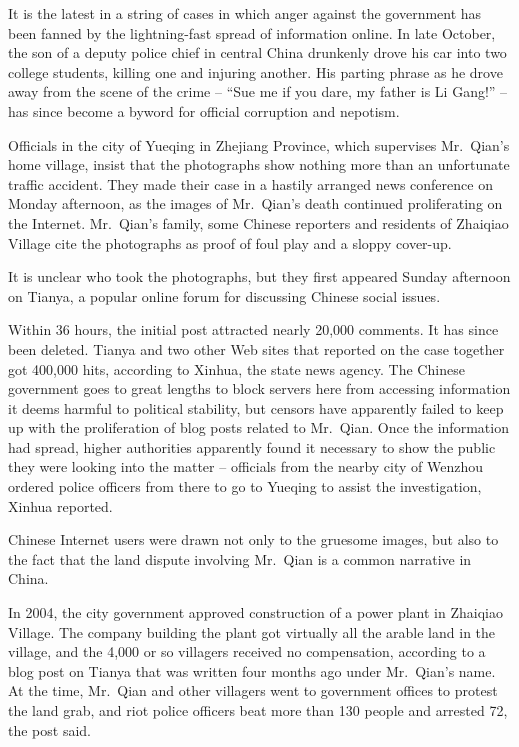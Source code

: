 ﻿\documentclass[12pt]{article}
\begin{document}
It is the latest in a string of cases in which anger against the government has been fanned by the
lightning-fast spread of information online. In late October, the son of a deputy police chief in
central China drunkenly drove his car into two college students, killing one and injuring another.
His parting phrase as he drove away from the scene of the crime -- ``Sue me if you dare, my father
is Li Gang!'' -- has since become a byword for official corruption and nepotism.

Officials in the city of Yueqing in Zhejiang Province, which supervises Mr.~Qian's home village,
insist that the photographs show nothing more than an unfortunate traffic accident. They made their
case in a hastily arranged news conference on Monday afternoon, as the images of Mr.~Qian's death
continued proliferating on the Internet. Mr.~Qian's family, some Chinese reporters and residents of
Zhaiqiao Village cite the photographs as proof of foul play and a sloppy cover-up.

It is unclear who took the photographs, but they first appeared Sunday afternoon on Tianya, a
popular online forum for discussing Chinese social issues.

Within 36 hours, the initial post attracted nearly 20,000 comments. It has since been deleted.
Tianya and two other Web sites that reported on the case together got 400,000 hits, according to
Xinhua, the state news agency. The Chinese government goes to great lengths to block servers here
from accessing information it deems harmful to political stability, but censors have apparently
failed to keep up with the proliferation of blog posts related to Mr.~Qian. Once the information had
spread, higher authorities apparently found it necessary to show the public they were looking into
the matter -- officials from the nearby city of Wenzhou ordered police officers from there to go to
Yueqing to assist the investigation, Xinhua reported.

Chinese Internet users were drawn not only to the gruesome images, but also to the fact that the
land dispute involving Mr.~Qian is a common narrative in China.

In 2004, the city government approved construction of a power plant in Zhaiqiao Village. The company
building the plant got virtually all the arable land in the village, and the 4,000 or so villagers
received no compensation, according to a blog post on Tianya that was written four months ago under
Mr.~Qian's name. At the time, Mr.~Qian and other villagers went to government offices to protest the
land grab, and riot police officers beat more than 130 people and arrested 72, the post said.
\end{document}
